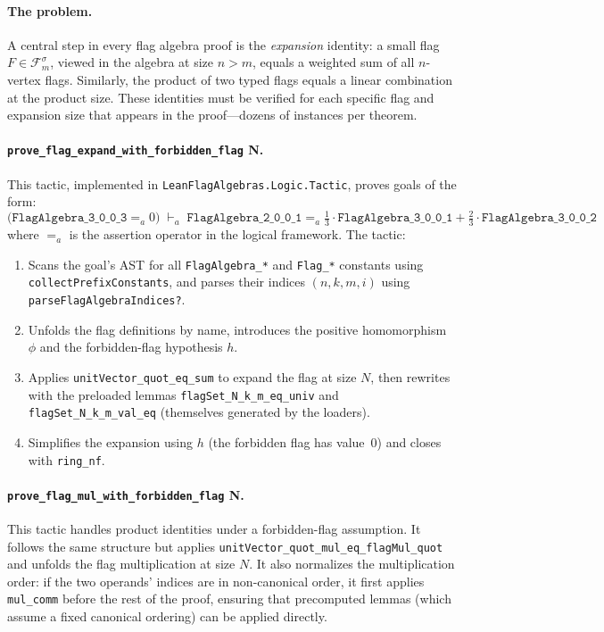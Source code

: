 \documentclass{article}
\newcommand{\Flag}[1]{\mathcal{F}^{#1}}
\newcommand{\lean}[1]{\texttt{#1}}
\begin{document}
\paragraph{The problem.}
A central step in every flag algebra proof is the \emph{expansion} identity: a
small flag $F \in \Flag{\sigma}_m$, viewed in the algebra at size $n > m$,
equals a weighted sum of all $n$-vertex flags.  Similarly, the product of two
typed flags equals a linear combination at the product size.  These identities
must be verified for each specific flag and expansion size that appears in the
proof---dozens of instances per theorem.

\paragraph{\lean{prove\_flag\_expand\_with\_forbidden\_flag} N.}
This tactic, implemented in \lean{LeanFlagAlgebras.Logic.Tactic}, proves goals
of the form:
\[
  \bigl(\lean{FlagAlgebra\_3\_0\_0\_3} =_{a} 0\bigr)
  \;\vdash_a\;
  \lean{FlagAlgebra\_2\_0\_0\_1} =_{a} \tfrac{1}{3} \cdot \lean{FlagAlgebra\_3\_0\_0\_1}
    + \tfrac{2}{3} \cdot \lean{FlagAlgebra\_3\_0\_0\_2}
\]
where $=_{a}$ is the assertion operator in the logical framework.  The tactic:
\begin{enumerate}
  \item Scans the goal's AST for all \lean{FlagAlgebra\_*} and \lean{Flag\_*}
    constants using \lean{collectPrefixConstants}, and parses their indices
    $(n, k, m, i)$ using \lean{parseFlagAlgebraIndices?}.
  \item Unfolds the flag definitions by name, introduces the positive
    homomorphism $\phi$ and the forbidden-flag hypothesis $h$.
  \item Applies \lean{unitVector\_quot\_eq\_sum} to expand the flag at size
    $N$, then rewrites with the preloaded lemmas \lean{flagSet\_N\_k\_m\_eq\_univ}
    and \lean{flagSet\_N\_k\_m\_val\_eq} (themselves generated by the loaders).
  \item Simplifies the expansion using $h$ (the forbidden flag has value~0)
    and closes with \lean{ring\_nf}.
\end{enumerate}

\paragraph{\lean{prove\_flag\_mul\_with\_forbidden\_flag} N.}
This tactic handles product identities under a forbidden-flag assumption.  It
follows the same structure but applies \lean{unitVector\_quot\_mul\_eq\_flagMul\_quot}
and unfolds the flag multiplication at size $N$.  It also normalizes the
multiplication order: if the two operands' indices are in non-canonical order,
it first applies \lean{mul\_comm} before the rest of the proof, ensuring that
precomputed lemmas (which assume a fixed canonical ordering) can be applied
directly.
\end{document}
